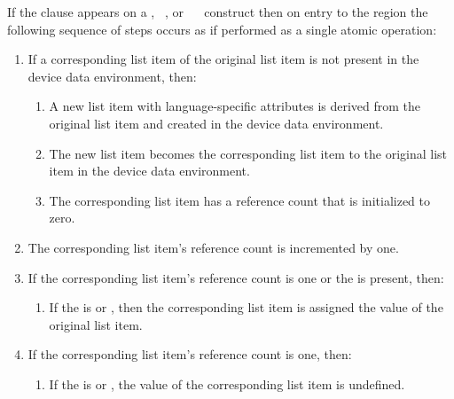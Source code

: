 {{{{If the  clause appears on a , ~, or ~~ construct then on entry to the region the following sequence of steps occurs as if performed as a single atomic operation:
\begin{enumerate}
\item If a corresponding list item of the original list item is not present in the device data environment, then:
\begin{enumerate}
\item A new list item with language-specific attributes is derived from the original list item and created in the device data environment.
\item The new list item becomes the corresponding list item to the original list item in the device data environment.
\item The corresponding list item has a reference count that is initialized to zero. 
\end{enumerate}
\item The corresponding list item's reference count is incremented by one.
\item If the corresponding list item's reference count is one or the   is present, then:
\begin{enumerate}
\item If the  is  or , then the corresponding list item is assigned the value of the original list item. 
\end{enumerate}
\item If the corresponding list item's reference count is one, then:
\begin{enumerate}
\item If the  is  or , the value of the corresponding list item is undefined. 
\end{enumerate}
\end{enumerate}

}}}}

